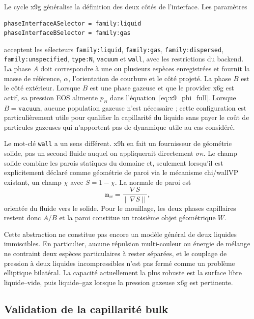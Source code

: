 \documentclass[11pt,a4paper]{article}
\begin{document}
Le cycle x9g généralise la définition des deux côtés de l'interface. Les paramètres
\begin{verbatim}
phaseInterfaceASelector = family:liquid
phaseInterfaceBSelector = family:gas
\end{verbatim}
acceptent les sélecteurs \texttt{family:liquid}, \texttt{family:gas}, \texttt{family:dispersed}, \texttt{family:unspecified}, \texttt{type:N}, \texttt{vacuum} et \texttt{wall}, avec les restrictions du backend. La phase $A$ doit correspondre à une ou plusieurs espèces enregistrées et fournit la masse de référence, $\alpha$, l'orientation de courbure et le côté projeté. La phase $B$ est le côté extérieur. Lorsque $B$ est une phase gazeuse et que le provider x6g est actif, sa pression EOS alimente $p_B$ dans l'équation~\eqref{eq:x9_phi_full}. Lorsque $B=\texttt{vacuum}$, aucune population gazeuse n'est nécessaire ; cette configuration est particulièrement utile pour qualifier la capillarité du liquide sans payer le coût de particules gazeuses qui n'apportent pas de dynamique utile au cas considéré.

Le mot-clé \texttt{wall} a un sens différent. x9h en fait un fournisseur de géométrie solide, pas un second fluide auquel on appliquerait directement $\sigma\kappa$. Le champ solide combine les parois statiques du domaine et, seulement lorsqu'il est explicitement déclaré comme géométrie de paroi via le mécanisme chi/wallVP existant, un champ $\chi$ avec $S=1-\chi$. La normale de paroi est
\begin{equation}
  \bm n_w=\frac{\nabla S}{\lVert\nabla S\rVert},
\end{equation}
orientée du fluide vers le solide. Pour le mouillage, les deux phases capillaires restent donc $A/B$ et la paroi constitue un troisième objet géométrique $W$.

Cette abstraction ne constitue pas encore un modèle général de deux liquides immiscibles. En particulier, aucune répulsion multi-couleur ou énergie de mélange ne contraint deux espèces particulaires à rester séparées, et le couplage de pression à deux liquides incompressibles n'est pas fermé comme un problème elliptique bilatéral. La capacité actuellement la plus robuste est la surface libre liquide--vide, puis liquide--gaz lorsque la pression gazeuse x6g est pertinente.

\subsection{Validation de la capillarité bulk}
\end{document}

